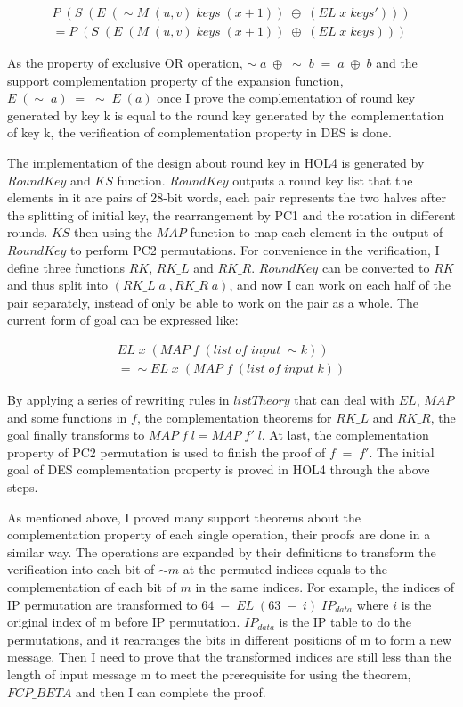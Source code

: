 \documentclass{article}
\begin{document}
\begin{multline}
P \; (S \; (E \;(\sim M \; (u, v) \; keys \; (x+1)) \; \oplus \; (EL \;x \;keys')))\\
= P \; (S \; (E \;(M \; (u, v) \; keys \; (x+1)) \;\oplus \;(EL \;x \;keys)))
\end{multline}

As the property of exclusive OR operation, $\sim \; a \; \oplus \; \sim \; b \;= \;a \; \oplus \; b$ and the support
complementation property of the expansion function, $E \; (\sim \; a) \;= \; \sim \; E \; (a)$ once I prove the complementation of
round key generated by key k is equal to the round key generated by the complementation of key k, the verification of complementation property
in DES is done.

The implementation of the design about round key in HOL4 is generated by $RoundKey$ and $KS$ function. $RoundKey$ outputs a
round key list that the elements in it
are pairs of 28-bit words, each pair represents the two halves after the splitting of initial key, the rearrangement by PC1
and the rotation in different rounds. $KS$ then using the $MAP$ function to map each element in the output of $RoundKey$ to
perform PC2 permutations. For convenience in the verification, I define three functions $RK$, $RK\_L$ and $RK\_R$.
$RoundKey$ can be converted to $RK$ and thus split into $(RK\_L \; a \;,RK\_R \; a)$, and now I can work on each half of the pair
separately, instead of only be able to work on the pair as a whole. The current form of goal can be expressed like:

\begin{multline}
EL \; x \; (MAP \; f \; (list \; of \; input \; \sim k))\\
= \sim EL \; x \; (MAP \; f \; (list \; of \; input \; k))
\end{multline}

By applying a series of rewriting rules in $listTheory$ that can deal with $EL$, $MAP$ and some functions in $f$, the complementation
theorems for $RK\_L$ and $RK\_R$, the goal finally transforms to $MAP\; f \;l = MAP\; f'\; l$. At last, the complementation property of PC2
permutation is used
to finish the proof of $f\;=\;f'$. The initial goal of DES complementation property is proved in HOL4 through the above steps.

As mentioned above, I proved many support theorems about the complementation property of each single operation, their proofs are
done in a similar way. The operations are expanded by their definitions to transform the verification into each bit of $\sim m$
at the permuted indices equals to the complementation of each bit of $m$ in the same indices. For example, the indices of IP
permutation are transformed to $64 \; - \; EL \; (63 \;-\;i) \; IP_{data}$ where $i$ is the original index of m before IP
permutation. $IP_{data}$ is the IP table to do the permutations, and it rearranges the bits in different positions of m
to form a new message. Then I need to prove that the transformed indices are still less than the length of input message m to
meet the prerequisite for using the theorem, $FCP\_BETA$ and then I can complete the proof.
\end{document}
